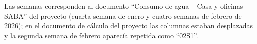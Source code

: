 Las semanas corresponden al documento \enquote{Consumo de agua -- Casa y oficinas SABA} del proyecto (cuarta semana de enero y cuatro semanas de febrero de 2026); en el documento de cálculo del proyecto las columnas estaban desplazadas y la segunda semana de febrero aparecía repetida como \enquote{02S1}.
